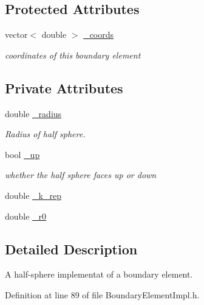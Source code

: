 \subsection*{Protected Attributes}
\begin{DoxyCompactItemize}
\item 
vector$<$ double $>$ \hyperlink{classBoundaryElement_ab51302e10e3e2def98438234ba5bf801}{\+\_\+coords}
\begin{DoxyCompactList}\small\item\em coordinates of this boundary element \end{DoxyCompactList}\end{DoxyCompactItemize}
\subsection*{Private Attributes}
\begin{DoxyCompactItemize}
\item 
double \hyperlink{classHalfSphereZBoundaryElement_ad1fff310ac2c3f221a8ab7393dc23b69}{\+\_\+radius}
\begin{DoxyCompactList}\small\item\em Radius of half sphere. \end{DoxyCompactList}\item 
bool \hyperlink{classHalfSphereZBoundaryElement_a3251d9e34c161076f9324dc3f2477720}{\+\_\+up}
\begin{DoxyCompactList}\small\item\em whether the half sphere faces up or down \end{DoxyCompactList}\item 
double \hyperlink{classHalfSphereZBoundaryElement_aaafd14a29987646f9537a7248ba6291b}{\+\_\+k\+\_\+rep}
\item 
double \hyperlink{classHalfSphereZBoundaryElement_afa790cdbea557aa8615188211acaedce}{\+\_\+r0}
\end{DoxyCompactItemize}


\subsection{Detailed Description}
A half-\/sphere implementat of a boundary element. 

Definition at line 89 of file Boundary\+Element\+Impl.\+h.



